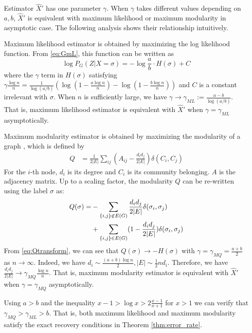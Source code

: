 \documentclass[entropy,article,submit,moreauthors,pdftex]{Definitions/mdpi}
\newcommand{\A}{\frac{a \log n}{n}}
\newcommand{\B}{\frac{b \log n}{n}}
\newcommand{\1}{\mathbbm{1}}
\begin{document}
Estimator $\hat{X}'$ has one parameter $\gamma$. When $\gamma$ takes different values depending on $a,b$, $\hat{X}'$
is equivalent with maximum likelihood or maximum modularity in asymptotic case. The following analysis shows
their relationship intuitively.

Maximum likelihood estimator is obtained by maximizing the log likelihood function.
From \eqref{eq:GmL}, this function can be written as
$$
\log P_G(Z|X=\sigma) = -\log\frac{a}{b} \cdot H(\sigma) + C
$$
where the $\gamma$ term in $H(\sigma)$ satisfying $\gamma \frac{\log n}{n} = \frac{1}{\log(a/b)}(\log (1-\A) - \log (1-\B))$ and $C$ is a constant irrelevant with $\sigma$.
When $n$ is sufficiently large, we have $\gamma \to \gamma_{ML} := \frac{a-b}{\log(a/b)}$.
That is, maximum likelihood estimator is equivalent with $\hat{X}'$ when $\gamma = \gamma_{ML}$ asymptotically.


Maximum modularity estimator is obtained by maximizing the modularity of a graph \cite{clauset2004finding}, which is defined by
\begin{align}\label{eq:Q}
Q &= \frac{1}{2 |E|} \sum_{ij} (A_{ij} - \frac{d_i d_j}{2 |E|}) \delta(C_i, C_j)
\end{align}
For the $i$-th node, $d_i$ is its degree and $C_i$ is its community belonging. $A$ is the adjacency matrix.
Up to a scaling factor, the modularity $Q$ can be re-written using the label $\sigma$ as:
\begin{align}
Q(\sigma) = &-\sum_{\{i,j\} \not\in E(G) } \frac{d_i d_j}{2 |E|}\delta(\sigma_i,\sigma_j) \notag \\
&+ \sum_{\{i,j\} \in E(G) } (1 - \frac{d_i d_j}{2 |E|}) \delta(\sigma_i,\sigma_j)  \label{eq:Qtransform}
\end{align}
From \eqref{eq:Qtransform}, we can see that $Q(\sigma) \to -H(\sigma)$ with $\gamma = \gamma_{MQ} = \frac{a+b}{2}$ as $n\to \infty$.
Indeed, we have $d_i \sim \frac{(a+b)\log n}{2}, |E| \sim \frac{1}{2}n d_i$. Therefore, we have $\frac{d_id_j}{2|E|} \to \gamma_{MQ} \frac{\log n}{n} $. That is, maximum modularity estimator is equivalent with $\hat{X}'$ when $\gamma = \gamma_{MQ}$ asymptotically.


Using $a>b$ and the inequality $x-1>\log x > 2 \frac{x-1}{x+1}$ for $x>1$ we can verify that $\gamma_{MQ} > \gamma_{ML} > b$. That is, both maximum likelihood and maximum modularity satisfy the exact recovery conditions in Theorem \ref{thm:error_rate}.
\end{document}

